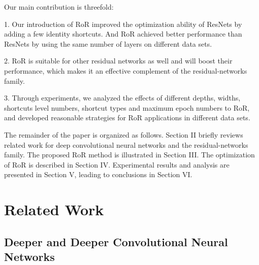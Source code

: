 \documentclass[journal]{IEEEtran}
\begin{document}
\par
Our main contribution is threefold:
\par
 1. Our introduction of RoR improved the optimization ability of ResNets by adding a few identity shortcuts. And RoR achieved better performance than ResNets by using the same number of layers on different data sets.
\par 
 2. RoR is suitable for other residual networks as well and will boost their performance, which makes it an effective complement of the residual-networks family.
 \par 
 3. Through experiments, we analyzed the effects of different depths, widths, shortcuts level numbers, shortcut types and maximum epoch numbers to RoR, and developed reasonable strategies for RoR applications in different data sets.
\par
 The remainder of the paper is organized as follows. Section II briefly reviews related work for deep convolutional neural networks and the residual-networks family. The proposed RoR method is illustrated in Section III. The optimization of RoR is described in Section IV. Experimental results and analysis are presented in Section V, leading to conclusions in Section VI. 

\section{Related Work}

\subsection{Deeper and Deeper Convolutional Neural Networks}
\end{document}
